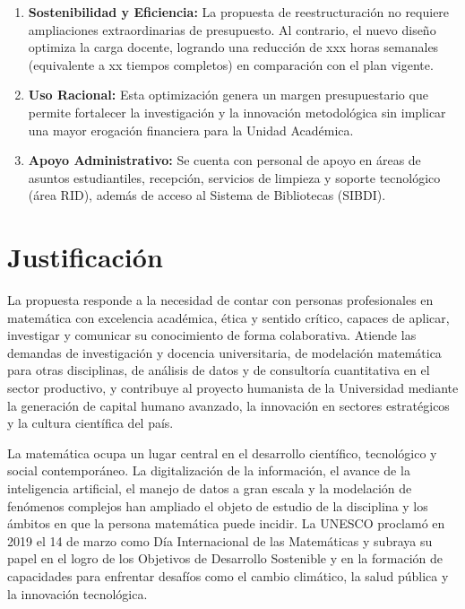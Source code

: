 \documentclass[11pt,a4paper]{article}
\begin{document}
\begin{itemize}
    \begin{enumerate}
        \item \textbf{Sostenibilidad y Eficiencia:} La propuesta de reestructuración no requiere ampliaciones extraordinarias de presupuesto. Al contrario, el nuevo diseño optimiza la carga docente, logrando una reducción de xxx horas semanales (equivalente a xx tiempos completos) en comparación con el plan vigente.
        \item \textbf{Uso Racional:} Esta optimización genera un margen presupuestario que permite fortalecer la investigación y la innovación metodológica sin implicar una mayor erogación financiera para la Unidad Académica.
        \item \textbf{Apoyo Administrativo:} Se cuenta con personal de apoyo en áreas de asuntos estudiantiles, recepción, servicios de limpieza y soporte tecnológico (área RID), además de acceso al Sistema de Bibliotecas (SIBDI).
    \end{enumerate}
\end{itemize}


\section{Justificación}

La propuesta responde a la necesidad de contar con personas profesionales en matemática con excelencia académica, ética y sentido crítico, capaces de aplicar, investigar y comunicar su conocimiento de forma colaborativa. Atiende las demandas de investigación y docencia universitaria, de modelación matemática para otras disciplinas, de análisis de datos y de consultoría cuantitativa en el sector productivo, y contribuye al proyecto humanista de la Universidad mediante la generación de capital humano avanzado, la innovación en sectores estratégicos y la cultura científica del país.

La matemática ocupa un lugar central en el desarrollo científico, tecnológico y social contemporáneo. La digitalización de la información, el avance de la inteligencia artificial, el manejo de datos a gran escala y la modelación de fenómenos complejos han ampliado el objeto de estudio de la disciplina y los ámbitos en que la persona matemática puede incidir. La UNESCO proclamó en 2019 el 14 de marzo como Día Internacional de las Matemáticas y subraya su papel en el logro de los Objetivos de Desarrollo Sostenible y en la formación de capacidades para enfrentar desafíos como el cambio climático, la salud pública y la innovación tecnológica.
\end{document}
